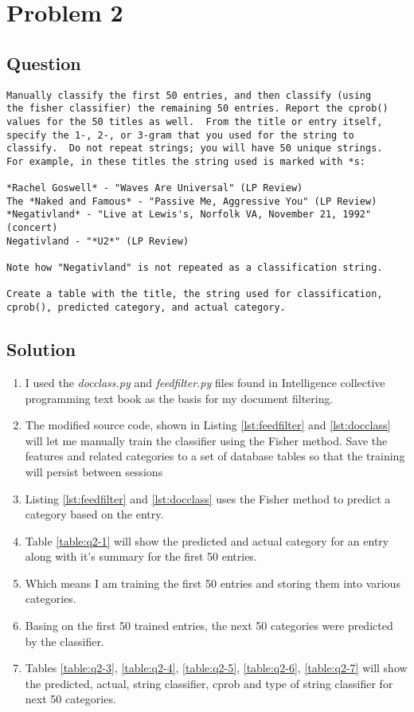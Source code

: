 \section{Problem 2}
\label{part2}
\subsection*{Question}
\begingroup
\begin{verbatim}
Manually classify the first 50 entries, and then classify (using
the fisher classifier) the remaining 50 entries. Report the cprob()
values for the 50 titles as well.  From the title or entry itself,
specify the 1-, 2-, or 3-gram that you used for the string to
classify.  Do not repeat strings; you will have 50 unique strings.
For example, in these titles the string used is marked with *s:

*Rachel Goswell* - "Waves Are Universal" (LP Review) 
The *Naked and Famous* - "Passive Me, Aggressive You" (LP Review)
*Negativland* - "Live at Lewis's, Norfolk VA, November 21, 1992" (concert)
Negativland - "*U2*" (LP Review)

Note how "Negativland" is not repeated as a classification string.

Create a table with the title, the string used for classification,
cprob(), predicted category, and actual category.
\end{verbatim}
\subsection{Solution}
\begin{enumerate}
\item I used the \emph{docclass.py} and \emph{feedfilter.py} files found in Intelligence collective programming text book as the basis for my document filtering.
\item The modified source code, shown in Listing \ref{lst:feedfilter} and \ref{lst:docclass} will let me manually train the classifier using the Fisher method. Save the features and related categories
to a set of database tables so that the training will persist between sessions
\item Listing \ref{lst:feedfilter} and \ref{lst:docclass} uses the Fisher method to predict a category based on the entry.
\item Table \ref{table:q2-1} will show the predicted and actual category for an entry along with it's summary for the first 50 entries. 
\item Which means I am training the first 50 entries and storing them into various categories.
\item Basing on the first 50 trained entries, the next 50 categories were predicted by the classifier. 
\item Tables \ref{table:q2-3}, \ref{table:q2-4}, \ref{table:q2-5}, \ref{table:q2-6}, \ref{table:q2-7} will show the predicted, actual, string classifier, cprob and type of string classifier for next 50 categories.
\end{enumerate}

